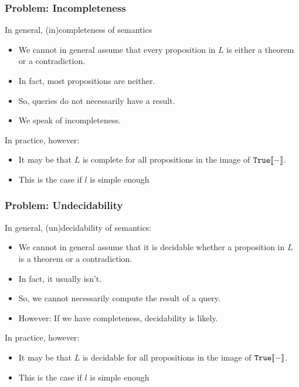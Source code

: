 \begin{frame}\frametitle{Problem: Incompleteness}
In general, (in)completeness of semantics
\begin{itemize}
\item We cannot in general assume that every proposition in $L$ is either a theorem or a contradiction.
\item In fact, most propositions are neither.
\item So, queries do not necessarily have a result.
\item We speak of incompleteness. 
\end{itemize}

In practice, however:
\begin{itemize}
\item It may be that $L$ is complete for all propositions in the image of $\mathtt{True}\llbracket -\rrbracket$.
\item This is the case if $l$ is simple enough 
\end{itemize}
\end{frame}

\begin{frame}\frametitle{Problem: Undecidability}
In general, (un)decidability of semantics:
\begin{itemize}
\item We cannot in general assume that it is decidable whether a proposition in $L$ is a theorem or a contradiction.
\item In fact, it usually isn't.
\item So, we cannot necessarily compute the result of a query.
\item However: If we have completeness, decidability is likely.
\end{itemize}

In practice, however:
\begin{itemize}
\item It may be that $L$ is decidable for all propositions in the image of $\mathtt{True}\llbracket -\rrbracket$.
\item This is the case if $l$ is simple enough 
\end{itemize}
\end{frame}

